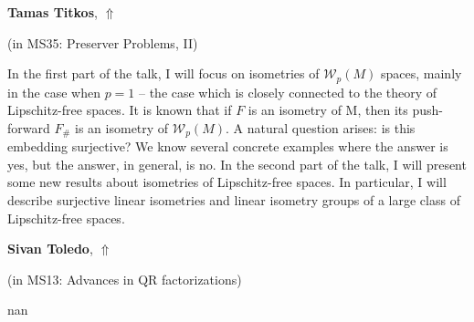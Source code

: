 \documentclass[ILAS2025-program.tex]{subfiles}
\begin{document}
     \hypertarget{down0315}{}\begin{ilasabstract}
    
    \textbf{Tamas Titkos},  \hfill \hyperlink{up0315}{$\Uparrow$}
    
    (in {\color{mstitle}MS35: Preserver Problems, II})
        
        \mtskip
    In the first part of the talk, I will focus on isometries of $\mathcal{W}_p(M)$ spaces, mainly in the case when $p=1$ -- the case which is closely connected to the theory of Lipschitz-free spaces. It is known that if $F$ is an isometry of M, then its push-forward $F_{\#}$ is an isometry of $\mathcal{W}_p(M)$. A natural question arises: is this embedding surjective? We know several concrete examples where the answer is yes, but the answer, in general, is no. In the second part of the talk, I will present some new results about isometries of Lipschitz-free spaces. In particular, I will describe surjective linear isometries and linear isometry groups of a large class of Lipschitz-free spaces.
\end{ilasabstract}
     \hypertarget{down0342}{}\begin{ilasabstract}
    
    \textbf{Sivan Toledo},  \hfill \hyperlink{up0342}{$\Uparrow$}
    
    (in {\color{mstitle}MS13: Advances in QR factorizations})
        
        \mtskip
    nan\end{ilasabstract}
\end{document}
